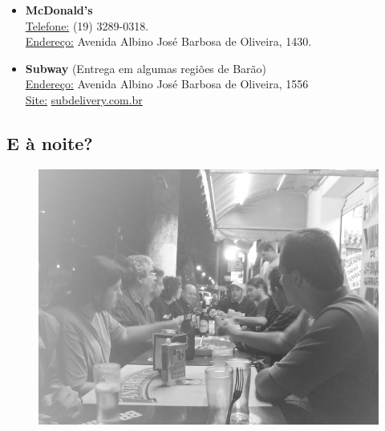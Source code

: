 \begin{itemize}
\item  \textbf{McDonald's}
\\\underline{Telefone:} (19) 3289-0318.
\\\underline{Endereço:} Avenida Albino José Barbosa de Oliveira, 1430.

\item  \textbf{Subway} (Entrega em algumas regiões de Barão)
\\\underline{Endereço:} Avenida Albino José Barbosa de Oliveira, 1556
\\\underline{Site:} \url{subdelivery.com.br}
\end{itemize}

\subsection{E à noite?}
\begin{figure}[b!]
    \centering
    \includegraphics[scale=0.72,keepaspectratio=true]{img/imgs/6-comida/-052.jpg}
\end{figure}

